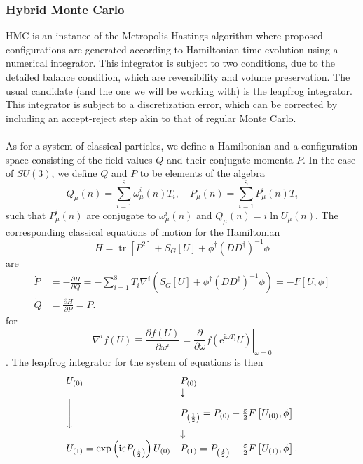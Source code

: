 \documentclass[a4paper,10pt]{article}
\begin{document}
\subsubsection{Hybrid Monte Carlo}\label{HMC}
HMC is an instance of the Metropolis-Hastings algorithm where proposed configurations are generated according to Hamiltonian time evolution using a numerical integrator. This integrator is subject to two conditions, due to the detailed balance condition, which are reversibility and volume preservation. The usual candidate (and the one we will be working with) is the leapfrog integrator. This integrator is subject to a discretization error, which can be corrected by including an accept-reject step akin to that of regular Monte Carlo.\\\\As for a system of classical particles, we define a Hamiltonian and a configuration space consisting of the field values $Q$ and their conjugate momenta $P$. In the case of $SU(3)$, we define $Q$ and $P$ to be elements of the algebra
\begin{equation}
Q_{\mu}(n) = \sum_{i=1}^{8} \omega_{\mu}^{i}(n) T_{i},\quad P_{\mu}(n)=\sum_{i=1}^{8} P_{\mu}^{i}(n) T_{i}
\end{equation}
such that $P_{\mu}^{i}(n)$ are conjugate to $\omega_{\mu}^{i}(n)$ and 
$Q_{\mu}(n)=i\operatorname{ln}U_{\mu}(n).$
The corresponding classical equations of motion for the Hamiltonian
\begin{equation}
H =\operatorname{tr}\left[P^{2}\right]+S_{G}[U]
+\phi^{\dagger}\left(D D^{\dagger}\right)^{-1} \phi
\end{equation}
are
\begin{equation}
\begin{aligned}
\dot{P} &=-\frac{\partial H}{\partial Q}=-\sum_{i=1}^{8} T_{i} \nabla^{i}\left(S_{G}[U]+\phi^{\dagger}\left(D D^{\dagger}\right)^{-1} \phi\right) =  -F[U, \phi]\\
\dot{Q} &=\frac{\partial H}{\partial P}=P.
\end{aligned}
\end{equation}
for 
\begin{equation}\label{eq:group_derivative}
\nabla^{i} f(U) \equiv \frac{\partial f(U)}{\partial \omega^{i}}=\left.\frac{\partial}{\partial \omega} f\left(\mathrm{e}^{\mathrm{i} \omega T_{i}} U\right)\right|_{\omega=0}
\end{equation}
\cite{Gattringer:2010zz}.
The leapfrog integrator for the system of equations is then
\begin{equation}\label{eq:leapfrog_evolution}
\begin{array}{ll}
U_{(0)} & P_{(0)} \\
 & \downarrow\\\Bigg\downarrow &P_{\left(\frac{1}{2}\right)}=P_{(0)}-\frac{\varepsilon}{2}F\left[ U_{(0)},\phi \right]  \\ &\downarrow
\\
U_{(1)}=\exp \left(\mathrm{i} \varepsilon P_{\left(\frac{1}{2}\right)}\right) U_{(0)} & P_{(1)}=P_{\left(\frac{1}{2}\right)}-\frac{\varepsilon}{2}F\left[ U_{(1)},\phi \right].
\end{array}
\end{equation}
\end{document}
